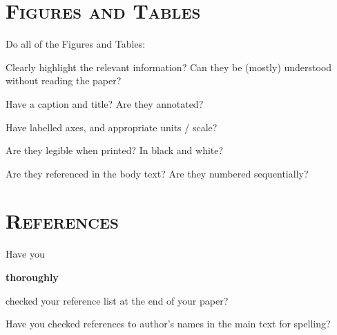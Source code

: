 \section*{\textsc{Figures and Tables}}
Do all of the Figures and Tables:
\begin{checklist}
	\item Clearly highlight the relevant information? Can they be (mostly) understood without reading the paper? 
	\item Have a caption and title? Are they annotated? 
	\item Have labelled axes, and appropriate units / scale?
	\item Are they legible when printed? In black and white?
	\item Are they referenced in the body text? Are they numbered sequentially?
\end{checklist}











\section*{\textsc{References}}

\begin{checklist}
	\item Have you \begin{em}\textbf{thoroughly}\end{em} checked your reference list at the end of your paper?
	\item Have you checked references to author's names in the main text for spelling?
\end{checklist}

